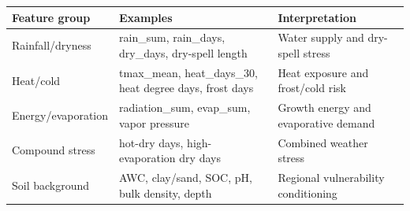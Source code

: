\begin{tabular}{lll}
\toprule
Feature group & Examples & Interpretation \\
\midrule
Rainfall/dryness & rain\_sum, rain\_days, dry\_days, dry-spell length & Water supply and dry-spell stress \\
Heat/cold & tmax\_mean, heat\_days\_30, heat degree days, frost days & Heat exposure and frost/cold risk \\
Energy/evaporation & radiation\_sum, evap\_sum, vapor pressure & Growth energy and evaporative demand \\
Compound stress & hot-dry days, high-evaporation dry days & Combined weather stress \\
Soil background & AWC, clay/sand, SOC, pH, bulk density, depth & Regional vulnerability conditioning \\
\bottomrule
\end{tabular}
